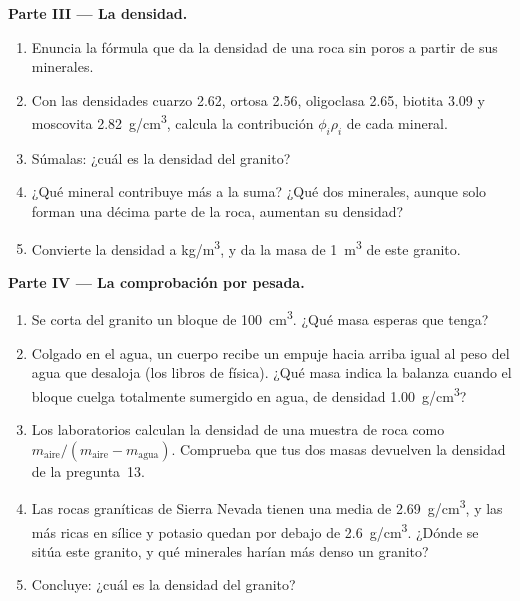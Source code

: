 \begin{problem}
\medskip
\noindent\textbf{Parte III --- La densidad.}
\begin{enumerate}[resume]
  \item Enuncia la fórmula que da la densidad de una roca sin poros a partir
        de sus minerales.
  \item Con las densidades cuarzo \qty{2.62}{}, ortosa \qty{2.56}{},
        oligoclasa \qty{2.65}{}, biotita \qty{3.09}{} y moscovita
        \qty{2.82}{g/cm^3}, calcula la contribución $\phi_i \rho_i$ de
        cada mineral.
  \item Súmalas: ¿cuál es la densidad del granito?
  \item ¿Qué mineral contribuye más a la suma? ¿Qué dos minerales, aunque solo
        forman una décima parte de la roca, aumentan su densidad?
  \item Convierte la densidad a \unit{kg/m^3}, y da la masa de
        \qty{1}{m^3} de este granito.
\end{enumerate}

\medskip
\noindent\textbf{Parte IV --- La comprobación por pesada.}
\begin{enumerate}[resume]
  \item Se corta del granito un bloque de \qty{100}{cm^3}. ¿Qué masa esperas
        que tenga?
  \item Colgado en el agua, un cuerpo recibe un empuje hacia arriba igual al
        peso del agua que desaloja (los libros de física). ¿Qué masa indica la
        balanza cuando el bloque cuelga totalmente sumergido en agua, de
        densidad \qty{1.00}{g/cm^3}?
  \item Los laboratorios calculan la densidad de una muestra de roca como
        $m_{\text{aire}}/(m_{\text{aire}} - m_{\text{agua}})$. Comprueba que
        tus dos masas devuelven la densidad de la pregunta~13.
  \item Las rocas graníticas de Sierra Nevada tienen una media de
        \qty{2.69}{g/cm^3}, y las más ricas en sílice y potasio quedan por
        debajo de \qty{2.6}{g/cm^3}. ¿Dónde se sitúa este granito, y qué
        minerales harían más denso un granito?
  \item Concluye: ¿cuál es la densidad del granito?
\end{enumerate}
\end{problem}
